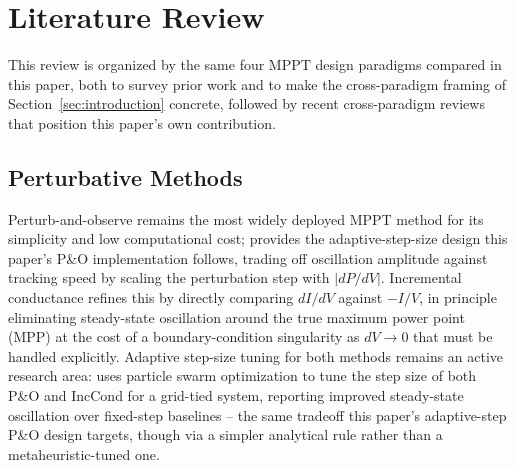 \section{Literature Review}
\label{sec:literature-review}


This review is organized by the same four MPPT design paradigms compared
in this paper, both to survey prior work and to make the cross-paradigm
framing of Section~\ref{sec:introduction} concrete, followed by recent
cross-paradigm reviews that position this paper's own contribution.

\subsection{Perturbative Methods}
Perturb-and-observe remains the most widely deployed MPPT method for its
simplicity and low computational cost; \cite{femia2005optimization}
provides the adaptive-step-size design this paper's P\&O implementation
follows, trading off oscillation amplitude against tracking speed by
scaling the perturbation step with $|dP/dV|$. Incremental conductance
\cite{hussein1995maximum} refines this by directly comparing $dI/dV$ against
$-I/V$, in principle eliminating steady-state oscillation around the true
maximum power point (MPP) at the cost of a boundary-condition singularity
as $dV \to 0$ that must be handled explicitly. Adaptive step-size tuning
for both methods remains an active research area:
\cite{ibrahim2023optimizing} uses particle swarm optimization to tune the
step size of both P\&O and IncCond for a grid-tied system, reporting
improved steady-state oscillation over fixed-step baselines -- the same
tradeoff this paper's adaptive-step P\&O design targets, though via a
simpler analytical rule rather than a metaheuristic-tuned one.

